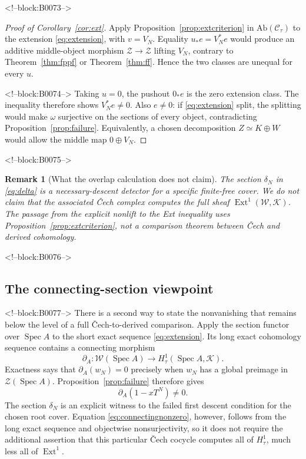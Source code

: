 \documentclass[11pt]{article}
\newtheorem{remark}[theorem]{Remark}
\theoremstyle{definition}
\newcommand{\Spec}{\operatorname{Spec}}
\newcommand{\Ext}{\operatorname{Ext}}
\newcommand{\Zsh}{\mathcal Z}
\newcommand{\Wsh}{\mathcal W}
\newcommand{\Ksh}{\mathcal K}
\begin{document}
<!--block:B0073-->
\begin{proof}[Proof of Corollary~\ref{cor:ext}]
Apply Proposition~\ref{prop:extcriterion} in
\(\mathrm{Ab}(\mathscr C_\tau)\) to the extension
\eqref{eq:extension}, with \(v=V_N\).  Equality
\(u_*e=V_N^*e\) would produce an additive middle-object morphism
\(\Zsh\to\Zsh\) lifting \(V_N\), contrary to
Theorem~\ref{thm:fppf} or Theorem~\ref{thm:ff}.  Hence the two classes are
unequal for every \(u\).

<!--block:B0074-->
Taking \(u=0\), the pushout \(0_*e\) is the zero extension class.  The
inequality therefore shows \(V_N^*e\ne0\).  Also \(e\ne0\): if
\eqref{eq:extension} split, the splitting would make \(\omega\) surjective
on the sections of every object, contradicting
Proposition~\ref{prop:failure}.  Equivalently, a chosen decomposition
\(Z\simeq K\oplus W\) would allow the middle map \(0\oplus V_N\).
\end{proof}

<!--block:B0075-->
\begin{remark}[What the overlap calculation does not claim]
The section \(\delta_N\) in \eqref{eq:delta} is a necessary-descent
detector for a specific finite-free cover.  We do not claim that the
associated \v Cech complex computes the full sheaf
\(\Ext^1(\Wsh,\Ksh)\).  The passage from the explicit nonlift to the Ext
inequality uses Proposition~\ref{prop:extcriterion}, not a comparison
theorem between \v Cech and derived cohomology.
\end{remark}

<!--block:B0076-->
\subsection{The connecting-section viewpoint}

<!--block:B0077-->
There is a second way to state the nonvanishing that remains below the
level of a full \v Cech-to-derived comparison.  Apply the section functor
over \(\Spec A\) to the short exact sequence
\eqref{eq:extension}.  Its long exact cohomology sequence contains a
connecting morphism
\[
 \partial_A\colon
 \Wsh(\Spec A)\longrightarrow
 H^1_\tau(\Spec A,\Ksh).
 \tag{5.2}\label{eq:connecting}
\]
Exactness says that \(\partial_A(w_N)=0\) precisely when \(w_N\) has a
global preimage in \(\Zsh(\Spec A)\).  Proposition~\ref{prop:failure}
therefore gives
\[
 \partial_A(1-xT^N)\ne0.
 \tag{5.3}\label{eq:connectingnonzero}
\]
The section \(\delta_N\) is an explicit witness to the failed first
descent condition for the chosen root cover.  Equation
\eqref{eq:connectingnonzero}, however, follows from the long exact
sequence and objectwise nonsurjectivity, so it does not require the
additional assertion that this particular \v Cech cocycle computes all of
\(H^1_\tau\), much less all of \(\Ext^1\).
\end{document}

